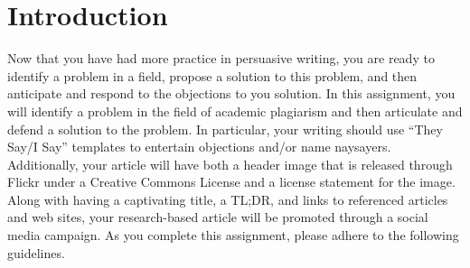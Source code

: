 

\usepackage[compact]{titlesec}




\vspace*{-.2in}
\section*{Introduction}

Now that you have had more practice in persuasive writing, you are ready to identify a problem in a field, propose a
solution to this problem, and then anticipate and respond to the objections to you solution. In this assignment, you
will identify a problem in the field of academic plagiarism and then articulate and defend a solution to the problem. In
particular, your writing should use ``They Say/I Say'' templates to entertain objections and/or name naysayers.
Additionally, your article will have both a header image that is released through Flickr under a Creative Commons
License and a license statement for the image. Along with having a captivating title, a TL;DR, and links to referenced
articles and web sites, your research-based article will be promoted through a social media campaign. As you complete
this assignment, please adhere to the following guidelines.

